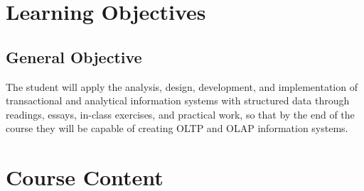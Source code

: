\documentclass[12pt,a4paper]{article}
\begin{document}
\section*{Learning Objectives}
\subsection*{General Objective}
The student will apply the analysis, design, development, and implementation of transactional and analytical information systems with structured data through readings, essays, in-class exercises, and practical work, so that by the end of the course they will be capable of creating OLTP and OLAP information systems.

\section*{Course Content}
\end{document}
